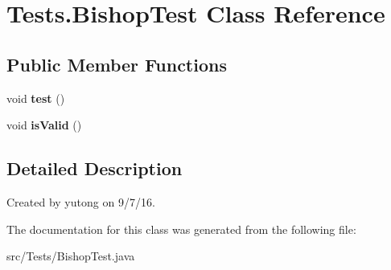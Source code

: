 \hypertarget{classTests_1_1BishopTest}{\section{Tests.\-Bishop\-Test Class Reference}
\label{classTests_1_1BishopTest}
}
\subsection*{Public Member Functions}
\begin{DoxyCompactItemize}
\item 
\hypertarget{classTests_1_1BishopTest_ae43c2bc5d02aa3a1a1338efd25081020}{void {\bfseries test} ()}\label{classTests_1_1BishopTest_ae43c2bc5d02aa3a1a1338efd25081020}

\item 
\hypertarget{classTests_1_1BishopTest_ac70b3913f45db662be354e2835c8922a}{void {\bfseries is\-Valid} ()}\label{classTests_1_1BishopTest_ac70b3913f45db662be354e2835c8922a}

\end{DoxyCompactItemize}


\subsection{Detailed Description}
Created by yutong on 9/7/16. 

The documentation for this class was generated from the following file\-:\begin{DoxyCompactItemize}
\item 
src/\-Tests/Bishop\-Test.\-java\end{DoxyCompactItemize}
